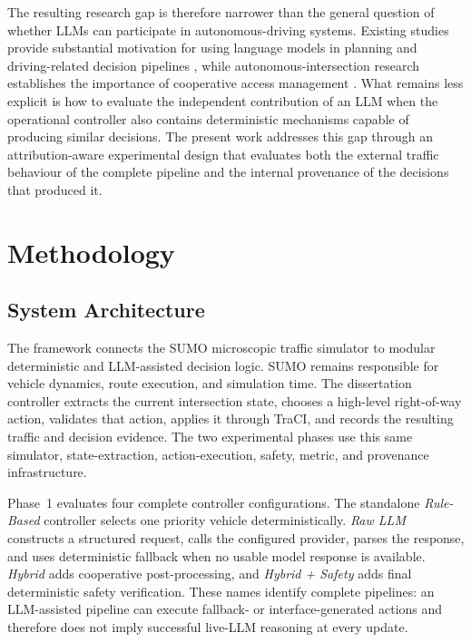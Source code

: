 \documentclass[letterpaper,10pt,conference]{ieeeconf}
\begin{document}
The resulting research gap is therefore narrower than the general question of whether LLMs can participate in autonomous-driving systems. Existing studies provide substantial motivation for using language models in planning and driving-related decision pipelines \cite{Wen2023,Jin2023,Cui2024,Yang2024,Li2024}, while autonomous-intersection research establishes the importance of cooperative access management \cite{Dresner2008,Safarov2022,Zhao2025}. What remains less explicit is how to evaluate the independent contribution of an LLM when the operational controller also contains deterministic mechanisms capable of producing similar decisions. The present work addresses this gap through an attribution-aware experimental design that evaluates both the external traffic behaviour of the complete pipeline and the internal provenance of the decisions that produced it.



\section{Methodology}



\subsection{System Architecture}



The framework connects the SUMO microscopic traffic simulator \cite{AlvarezLopez2018} to modular deterministic and LLM-assisted decision logic. SUMO remains responsible for vehicle dynamics, route execution, and simulation time. The dissertation controller extracts the current intersection state, chooses a high-level right-of-way action, validates that action, applies it through TraCI, and records the resulting traffic and decision evidence. The two experimental phases use this same simulator, state-extraction, action-execution, safety, metric, and provenance infrastructure.



Phase~1 evaluates four complete controller configurations. The standalone \emph{Rule-Based} controller selects one priority vehicle deterministically. \emph{Raw LLM} constructs a structured request, calls the configured provider, parses the response, and uses deterministic fallback when no usable model response is available. \emph{Hybrid} adds cooperative post-processing, and \emph{Hybrid + Safety} adds final deterministic safety verification. These names identify complete pipelines: an LLM-assisted pipeline can execute fallback- or interface-generated actions and therefore does not imply successful live-LLM reasoning at every update.
\end{document}
